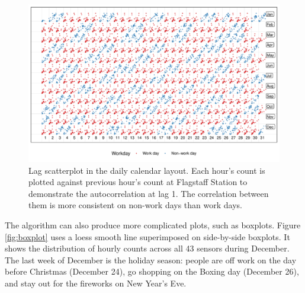 \documentclass[12pt]{article}
\begin{document}
\begin{figure}

{\centering \includegraphics[width=\textwidth]{figure/scatterplot-1} 

}

\caption{Lag scatterplot in the daily calendar layout. Each hour's count is plotted against previous hour's count at Flagstaff Station to demonstrate the autocorrelation at lag 1. The correlation between them is more consistent on non-work days than work days.}\label{fig:scatterplot}
\end{figure}

The algorithm can also produce more complicated plots, such as boxplots.
Figure \ref{fig:boxplot} uses a loess smooth line superimposed on
side-by-side boxplots. It shows the distribution of hourly counts across
all 43 sensors during December. The last week of December is the holiday
season: people are off work on the day before Christmas (December 24),
go shopping on the Boxing day (December 26), and stay out for the
fireworks on New Year's Eve.
\end{document}
